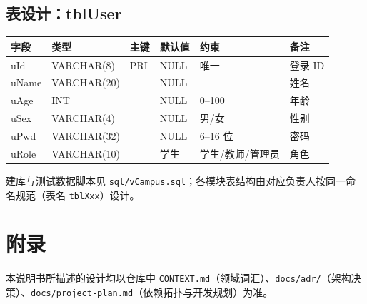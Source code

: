 \documentclass[12pt,a4paper]{ctexart}
\begin{document}
\subsection{表设计：tblUser}
\begin{center}
\begin{tabular}{l l l l l l}
\toprule
字段 & 类型 & 主键 & 默认值 & 约束 & 备注 \\
\midrule
uId & VARCHAR(8) & PRI & NULL & 唯一 & 登录 ID \\
uName & VARCHAR(20) &  & NULL &  & 姓名 \\
uAge & INT &  & NULL & 0--100 & 年龄 \\
uSex & VARCHAR(4) &  & NULL & 男/女 & 性别 \\
uPwd & VARCHAR(32) &  & NULL & 6--16 位 & 密码 \\
uRole & VARCHAR(10) &  & 学生 & 学生/教师/管理员 & 角色 \\
\bottomrule
\end{tabular}
\end{center}

建库与测试数据脚本见 \texttt{sql/vCampus.sql}；各模块表结构由对应负责人按同一命名规范（表名 \texttt{tblXxx}）设计。

\section*{附录}
本说明书所描述的设计均以仓库中 \texttt{CONTEXT.md}（领域词汇）、\texttt{docs/adr/}（架构决策）、\texttt{docs/project-plan.md}（依赖拓扑与开发规划）为准。
\end{document}
